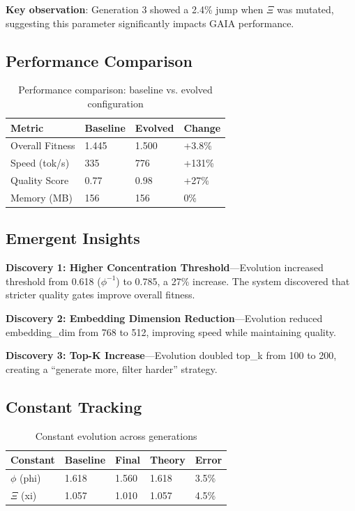 \documentclass[11pt,a4paper]{article}
\begin{document}
\textbf{Key observation}: Generation 3 showed a 2.4\% jump when $\Xi$ was mutated, suggesting this parameter significantly impacts GAIA performance.

\subsection{Performance Comparison}

\begin{table}[H]
\centering
\begin{tabular}{llll}
\toprule
\textbf{Metric} & \textbf{Baseline} & \textbf{Evolved} & \textbf{Change} \\
\midrule
Overall Fitness & 1.445 & 1.500 & +3.8\% \\
Speed (tok/s) & 335 & 776 & +131\% \\
Quality Score & 0.77 & 0.98 & +27\% \\
Memory (MB) & 156 & 156 & 0\% \\
\bottomrule
\end{tabular}
\caption{Performance comparison: baseline vs. evolved configuration}
\end{table}

\subsection{Emergent Insights}

\textbf{Discovery 1: Higher Concentration Threshold}---Evolution increased threshold from 0.618 ($\phi^{-1}$) to 0.785, a 27\% increase. The system discovered that stricter quality gates improve overall fitness.

\textbf{Discovery 2: Embedding Dimension Reduction}---Evolution reduced embedding\_dim from 768 to 512, improving speed while maintaining quality.

\textbf{Discovery 3: Top-K Increase}---Evolution doubled top\_k from 100 to 200, creating a ``generate more, filter harder'' strategy.

\subsection{Constant Tracking}

\begin{table}[H]
\centering
\begin{tabular}{lllll}
\toprule
\textbf{Constant} & \textbf{Baseline} & \textbf{Final} & \textbf{Theory} & \textbf{Error} \\
\midrule
$\phi$ (phi) & 1.618 & 1.560 & 1.618 & 3.5\% \\
$\Xi$ (xi) & 1.057 & 1.010 & 1.057 & 4.5\% \\
\bottomrule
\end{tabular}
\caption{Constant evolution across generations}
\end{table}
\end{document}
